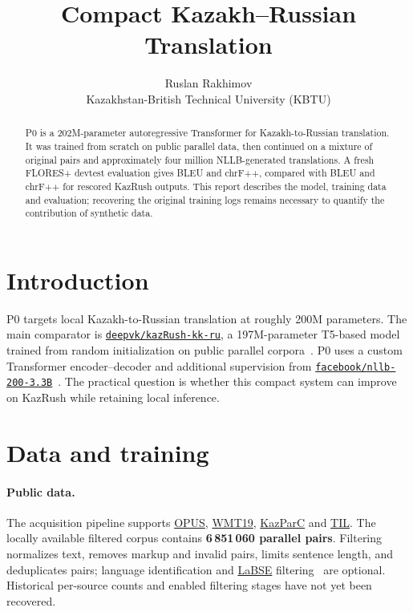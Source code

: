 \documentclass{article}
\title{Compact Kazakh--Russian Translation}
\author{Ruslan Rakhimov\\
 \normalfont Kazakhstan-British Technical University (KBTU)}
\date{}
\begin{document}
\maketitle
\begin{abstract}
P0 is a 202M-parameter autoregressive Transformer for Kazakh-to-Russian
translation. It was trained from scratch on public parallel data, then
continued on a mixture of original pairs and approximately four million
NLLB-generated translations. A fresh FLORES+ devtest evaluation gives
\PZeroBLEU{} BLEU and \PZeroChrFPP{} chrF++, compared with \KazBLEU{} BLEU
and \KazChrFPP{} chrF++ for rescored KazRush outputs. This report describes
the model, training data and evaluation; recovering the original training
logs remains necessary to quantify the contribution of synthetic data.
\end{abstract}

\section{Introduction}
P0 targets local Kazakh-to-Russian translation at roughly 200M parameters.
The main comparator is
\href{https://huggingface.co/deepvk/kazRush-kk-ru}{\texttt{deepvk/kazRush-kk-ru}}, a 197M-parameter
T5-based model trained from random initialization on public parallel
corpora~\cite{kazrush,t5}. P0 uses a custom Transformer encoder--decoder
and additional supervision from
\href{https://huggingface.co/facebook/nllb-200-3.3B}{\texttt{facebook/nllb-200-3.3B}}~\cite{transformer,nllb}.
The practical question is whether this compact system can improve on
KazRush while retaining local inference.

\section{Data and training}
\paragraph{Public data.}
The acquisition pipeline supports
\href{https://opus.nlpl.eu/}{OPUS},
\href{https://www.statmt.org/wmt19/}{WMT19},
\href{https://huggingface.co/datasets/issai/kazparc}{KazParC} and
\href{https://github.com/turkic-interlingua/til-mt}{TIL}. The locally
available filtered corpus contains \textbf{6\,851\,060 parallel pairs}.
Filtering normalizes text, removes markup and invalid pairs, limits sentence
length, and deduplicates pairs; language identification and
\href{https://arxiv.org/abs/2007.01852}{LaBSE} filtering~\cite{labse}
are optional. Historical per-source counts and enabled filtering stages
have not yet been recovered.
\end{document}
